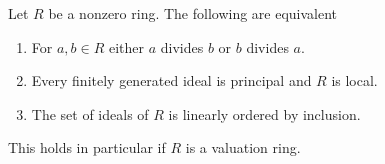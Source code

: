 \begin{lemma}
\label{lemma-generalized-valuation-ring}
\begin{reference}
\cite{Warfield-Decomposition}
\end{reference}
Let $R$ be a nonzero ring. The following are equivalent
\begin{enumerate}
\item For $a, b \in R$ either $a$ divides $b$ or $b$ divides $a$.
\item Every finitely generated ideal is principal and $R$ is local.
\item The set of ideals of $R$ is linearly ordered by inclusion.
\end{enumerate}
This holds in particular if $R$ is a valuation ring.
\end{lemma}